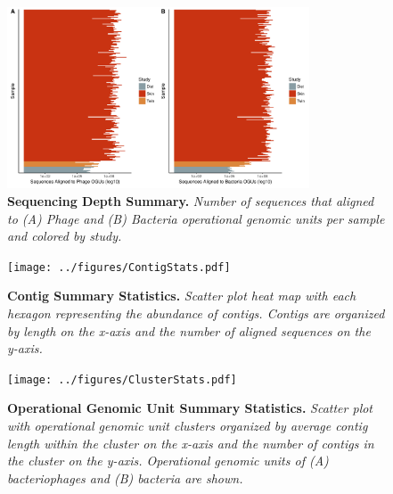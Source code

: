 \documentclass[12pt,]{article}
\newcommand{\beginsupplement}{%
        \setcounter{table}{0}
        \renewcommand{\thetable}{S\arabic{table}}%
        \setcounter{figure}{0}
        \renewcommand{\thefigure}{S\arabic{figure}}%
     }
\begin{document}
\beginsupplement

\begin{figure}[htbp]
\centering
\includegraphics[width=0.80000\textwidth]{../figures/SequenceAbund.pdf}
\caption{\textbf{Sequencing Depth Summary.} \emph{Number of sequences
that aligned to (A) Phage and (B) Bacteria operational genomic units per
sample and colored by study.}\label{SequenceStats}}
\end{figure}

\newpage

\begin{figure}[htbp]
\centering
\texttt{[image: ../figures/ContigStats.pdf]}
\caption{\textbf{Contig Summary Statistics.} \emph{Scatter plot heat map
with each hexagon representing the abundance of contigs. Contigs are
organized by length on the x-axis and the number of aligned sequences on
the y-axis.}\label{ContigStats}}
\end{figure}

\newpage

\begin{figure}[htbp]
\centering
\texttt{[image: ../figures/ClusterStats.pdf]}
\caption{\textbf{Operational Genomic Unit Summary Statistics.}
\emph{Scatter plot with operational genomic unit clusters organized by
average contig length within the cluster on the x-axis and the number of
contigs in the cluster on the y-axis. Operational genomic units of (A)
bacteriophages and (B) bacteria are shown.}\label{ClusterStats}}
\end{figure}

\newpage
\end{document}

